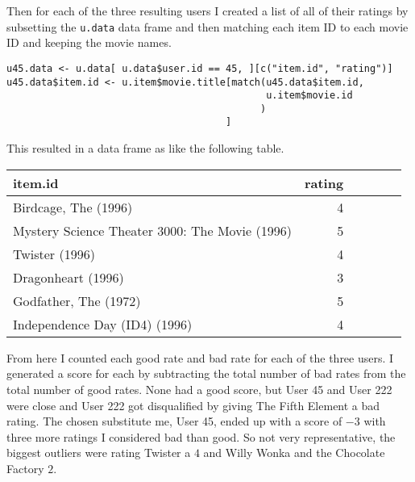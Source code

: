 \documentclass[12pt, a4paper]{article}
\newcommand{\code}[1]{\texttt{#1}}
\begin{document}
Then for each of the three resulting users I created a list of all of their ratings by subsetting the \code{u.data} data frame and then matching each item ID to each movie ID and keeping the movie names.

\begin{minipage}{\linewidth} %
\vspace{2em}
\begin{verbatim}
u45.data <- u.data[ u.data$user.id == 45, ][c("item.id", "rating")]
u45.data$item.id <- u.item$movie.title[match(u45.data$item.id, 
                                             u.item$movie.id
                                            )
                                      ]
\end{verbatim}
\vspace{2em}
\end{minipage}

\noindent
This resulted in a data frame as like the following table.

\begin{minipage}{\linewidth} %
\vspace{2em}
\centering
\begin{tabular}{|l|r|r|l|l|l|}
        \hline
        item.id & rating\\
        \hline
        Birdcage, The (1996) & 4\\
        \hline
        Mystery Science Theater 3000: The Movie (1996) & 5\\
        \hline
        Twister (1996) & 4\\
        \hline
        Dragonheart (1996) & 3\\
        \hline
        Godfather, The (1972) & 5\\
        \hline
        Independence Day (ID4) (1996) & 4\\
        \hline
\end{tabular}
\vspace{2em}
\end{minipage}

From here I counted each good rate and bad rate for each of the three users. I generated a score for each by subtracting the total number of bad rates from the total number of good rates. None had a good score, but User 45 and User 222 were close and User 222 got disqualified by giving The Fifth Element a bad rating. The chosen substitute me, User 45, ended up with a score of $-3$ with three more ratings I considered bad than good. So not very representative, the biggest outliers were rating Twister a $4$ and Willy Wonka and the Chocolate Factory $2$.
\end{document}
